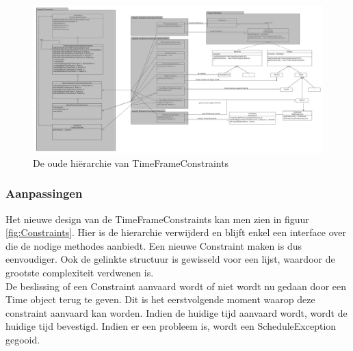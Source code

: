 \begin{figure}
\vspace{-2cm}
  \begin{center}
    \includegraphics[width=1.0\textheight,angle=270]{./exported/Constraints_OLD.pdf}
  \end{center}
\caption{De oude hiërarchie van TimeFrameConstraints\label{fig:constraints_old}}
\vspace{2cm}
\end{figure} 

\subsubsection{Aanpassingen}
Het nieuwe design van de TimeFrameConstraints kan men zien in figuur \ref{fig:Constraints}. 
Hier is de hierarchie verwijderd en blijft enkel een interface over die de nodige methodes aanbiedt. 
Een nieuwe Constraint maken is dus eenvoudiger. 
Ook de gelinkte structuur is gewisseld voor een lijst, waardoor de grootste complexiteit verdwenen is. \\

De beslissing of een Constraint aanvaard wordt of niet wordt nu gedaan door een Time object terug te geven. 
Dit is het eerstvolgende moment waarop deze constraint aanvaard kan worden. 
Indien de huidige tijd aanvaard wordt, wordt de huidige tijd bevestigd. 
Indien er een probleem is, wordt een ScheduleException gegooid. \\

